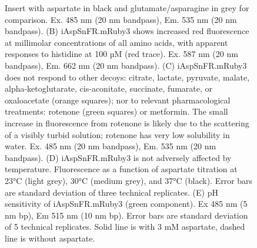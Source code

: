 \documentclass[9pt,lineno]{elife}
\begin{document}
\begin{figure}[ht!]
{Insert with aspartate in black and glutamate/asparagine in grey for comparison.
Ex. 485 nm (20 nm bandpass), Em. 535 nm (20 nm bandpass).
(B) iAspSnFR.mRuby3 shows increased red fluorescence at millimolar concentrations of all amino acids, with apparent responses to histidine at 100 µM (red trace).
Ex. 587 nm (20 nm bandpass), Em. 662 nm (20 nm bandpass).
(C) iAspSnFR.mRuby3 does not respond to other decoys: citrate, lactate, pyruvate, malate, alpha-ketoglutarate, cis-aconitate, succinate, fumarate, or oxaloacetate (orange squares); nor to relevant pharmacological treatments: rotenone (green squares) or metformin.
The small increase in fluorescence from rotenone is likely due to the scattering of a visibly turbid solution; rotenone has very low solubility in water.
Ex. 485 nm (20 nm bandpass), Em. 535 nm (20 nm bandpass).
(D) iAspSnFR.mRuby3 is not adversely affected by temperature.
Fluorescence as a function of aspartate titration at 23°C (light grey), 30°C (medium grey), and 37°C (black).
Error bars are standard deviation of three technical replicates.
(E) pH sensitivity of iAspSnFR.mRuby3 (green component).
Ex 485 nm (5 nm bp), Em 515 nm (10 nm bp).
Error bars are standard deviation of 5 technical replicates.
Solid line is with 3 mM aspartate, dashed line is without aspartate.
}{}\label{figsupp:f1S2}
\end{figure}
\end{document}
